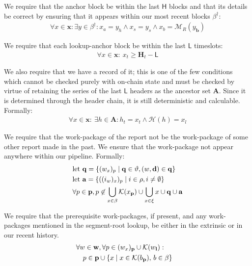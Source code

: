 We require that the anchor block be within the last $\mathsf{H}$ blocks and that its details be correct by ensuring that it appears within our most recent blocks $\beta^\dagger$:
\begin{align}
  \forall x \in \mathbf{x} : \exists y \in \beta^\dagger : x_a = y_h \wedge x_s = y_s \wedge x_b = \mathcal{M}_R(y_\mathbf{b})\!\!\!\!\!\!
\end{align}

We require that each lookup-anchor block be within the last $\mathsf{L}$ timeslots:
\begin{align}
  \forall x \in \mathbf{x} :\ x_t \ge \mathbf{H}_t - \mathsf{L}
\end{align}

We also require that we have a record of it; this is one of the few conditions which cannot be checked purely with on-chain state and must be checked by virtue of retaining the series of the last $\mathsf{L}$ headers as the ancestor set $\mathbf{A}$. Since it is determined through the header chain, it is still deterministic and calculable. Formally:
\begin{align}
  \forall x \in \mathbf{x} :\ \exists h \in \mathbf{A}: h_t = x_t \wedge \mathcal{H}(h) = x_l
\end{align}

We require that the work-package of the report not be the work-package of some other report made in the past. We ensure that the work-package not appear anywhere within our pipeline. Formally:
\begin{align}
  &\text{let } \mathbf{q} = \{(w_x)_p \mid \mathbf{q} \in \vartheta, (w, \mathbf{d}) \in \mathbf{q}\} \\
  &\text{let } \mathbf{a} = \{((i_w)_x)_p \mid i \in \rho, i \ne \emptyset\}\\
  &\forall p \in \mathbf{p}, p \not\in \bigcup_{x \in \beta}\mathcal{K}(x_\mathbf{p}) \cup \bigcup_{x \in \xi}x \cup \mathbf{q} \cup \mathbf{a}
\end{align}

We require that the prerequisite work-packages, if present, and any work-packages mentioned in the segment-root lookup, be either in the extrinsic or in our recent history.
\begin{align}
  &\begin{aligned}
    &\forall w \in \mathbf{w}, \forall p \in (w_x)_\mathbf{p} \cup \mathcal{K}(w_\mathbf{l}) :\\
    &\quad p \in \mathbf{p} \cup \{ x \mid x \in \mathcal{K}(b_\mathbf{p}) ,\, b \in \beta \}
  \end{aligned}
\end{align}

